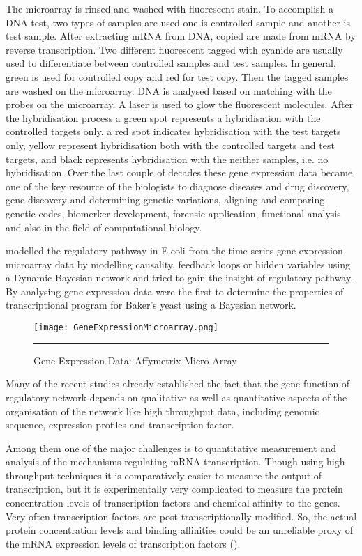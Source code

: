The microarray is rinsed and washed with fluorescent stain. To accomplish a DNA test, two types of samples are used one is controlled sample and another is test sample. After extracting mRNA from DNA, copied are made from mRNA by reverse transcription. Two different fluorescent tagged with cyanide are usually used to differentiate between controlled samples and test samples. In general, green is used for controlled copy and red for test copy. Then the tagged samples are washed on the microarray. DNA is analysed based on matching with the probes on the microarray. A laser is used to glow the fluorescent molecules. After the hybridisation process a green spot represents a hybridisation with the controlled targets only, a red spot indicates hybridisation with the test targets only, yellow represent hybridisation both with the controlled targets and test targets, and black represents hybridisation with the neither samples, i.e. no hybridisation. Over the last couple of decades these gene expression data became one of the key resource of the biologists to diagnose diseases and drug discovery, gene discovery and determining genetic variations, aligning and comparing genetic codes, biomerker development, forensic application, functional analysis and also in the field of computational biology.

\cite{Ong:2002} modelled the regulatory pathway in E.coli from the time series gene expression microarray data by modelling causality, feedback loops or hidden variables using a Dynamic Bayesian network and tried to gain the insight of regulatory pathway. By analysing gene expression data \cite{Friedman:2000} were the first to determine the properties of transcriptional program for Baker's yeast using a Bayesian network.

\begin{figure}[t]
	\centering
	\texttt{[image: GeneExpressionMicroarray.png]}
		\rule{35em}{0.5pt}
	\caption{Gene Expression Data: Affymetrix Micro Array}
	\label{fig:Gene Expression Microarray}
\end{figure}

Many of the recent studies already established the fact that the gene function of regulatory network depends on qualitative as well as quantitative aspects of the organisation of the network like high throughput data, including genomic sequence, expression profiles and transcription factor.

Among them one of the major challenges is to quantitative measurement and analysis of the mechanisms regulating mRNA transcription. Though using high throughput techniques it is comparatively easier to measure the output of transcription, but it is experimentally very complicated to measure the protein concentration levels of transcription factors and chemical affinity to the genes. Very often transcription factors are post-transcriptionally modified. So, the actual protein concentration levels and binding affinities could be an unreliable proxy of the mRNA expression levels of transcription factors (\cite{Sanguinetti:2006}).

